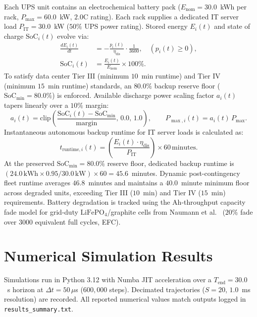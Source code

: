 \documentclass[preprint,12pt]{elsarticle}
\begin{document}
Each UPS unit contains an electrochemical battery pack ($E_{\mathrm{nom}} = 30.0$~kWh per rack, $P_{\max} = 60.0$~kW, $2.0$C rating). Each rack supplies a dedicated IT server load $P_{\mathrm{IT}} = 30.0$~kW ($50\%$ UPS power rating). Stored energy $E_i(t)$ and state of charge $\mathrm{SoC}_i(t)$ evolve via:
\begin{align}
\frac{dE_i(t)}{dt} &= -\frac{p_i(t)}{\eta_{\mathrm{dis}}} \cdot \frac{1}{3600}, \quad (p_i(t) \ge 0), \label{eq:de_dt}\\
\mathrm{SoC}_i(t) &= \frac{E_i(t)}{E_{\mathrm{nom}}} \times 100\%. \label{eq:soc_t}
\end{align}
To satisfy data center Tier III (minimum $10$~min runtime) and Tier IV (minimum $15$~min runtime) standards, an $80.0\%$ backup reserve floor ($\mathrm{SoC}_{\min} = 80.0\%$) is enforced. Available discharge power scaling factor $a_i(t)$ tapers linearly over a $10\%$ margin:
\begin{equation}
a_i(t) = \mathrm{clip}\!\left(\frac{\mathrm{SoC}_i(t) - \mathrm{SoC}_{\min}}{\mathrm{margin}},\, 0.0,\, 1.0\right), \qquad P_{\max,i}(t) = a_i(t)\,P_{\max}.
\label{eq:soc_gate}
\end{equation}
Instantaneous autonomous backup runtime for IT server loads is calculated as:
\begin{equation}
t_{\mathrm{runtime},i}(t) = \left(\frac{E_i(t) \cdot \eta_{\mathrm{dis}}}{P_{\mathrm{IT}}}\right) \times 60\,\mathrm{minutes}.
\label{eq:runtime_min}
\end{equation}
At the preserved $\mathrm{SoC}_{\min} = 80.0\%$ reserve floor, dedicated backup runtime is $(24.0\,\mathrm{kWh} \times 0.95 / 30.0\,\mathrm{kW}) \times 60 = 45.6$~minutes. Dynamic post-contingency fleet runtime averages $46.8$~minutes and maintains a $40.0$~minute minimum floor across degraded units, exceeding Tier III ($10$~min) and Tier IV ($15$~min) requirements. Battery degradation is tracked using the Ah-throughput capacity fade model for grid-duty $\mathrm{LiFePO}_4$/graphite cells from Naumann et al.~\cite{naumann2020} ($20\%$ fade over $3000$ equivalent full cycles, EFC).

\section{Numerical Simulation Results}
\label{sec:results}

Simulations run in Python 3.12 with Numba JIT acceleration over a $T_{\mathrm{end}} = 30.0$~s horizon at $\Delta t = 50\,\mu$s ($600{,}000$ steps). Decimated trajectories ($S=20$, $1.0$~ms resolution) are recorded. All reported numerical values match outputs logged in \texttt{results\_summary.txt}.
\end{document}
